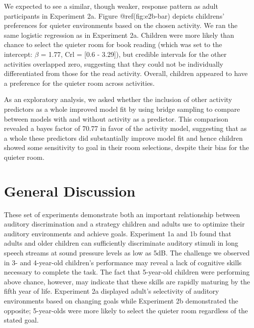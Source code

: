 \documentclass[10pt, letterpaper]{article}
\begin{document}
We expected to see a similar, though weaker, response pattern as adult
participants in Experiment 2a. Figure @ref(fig:e2b-bar) depicts
childrens' preferences for quieter environments based on the chosen
activity. We ran the same logistic regression as in Experiment 2a.
Children were more likely than chance to select the quieter room for
book reading (which was set to the intercept: \(\beta\) = 1.77, Crl =
{[}0.6 - 3.29{]}), but credible intervals for the other activities
overlapped zero, suggesting that they could not be individually
differentiated from those for the read activity. Overall, children
appeared to have a preference for the quieter room across activities.

As an exploratory analysis, we asked whether the inclusion of other
activity predictors as a whole improved model fit by using bridge
sampling to compare between models with and without activity as a
predictor. This comparison revealed a bayes factor of 70.77 in favor of
the activity model, suggesting that as a whole these predictors did
substantially improve model fit and hence children showed some
sensitivity to goal in their room selections, despite their bias for the
quieter room.

\hypertarget{general-discussion}{%
\section{General Discussion}\label{general-discussion}}

These set of experiments demonstrate both an important relationship
between auditory discrimination and a strategy children and adults use
to optimize their auditory environments and achieve goals. Experiment 1a
and 1b found that adults and older children can sufficiently
discriminate auditory stimuli in long speech streams at sound pressure
levels as low as 5dB. The challenge we observed in 3- and 4-year-old
children's performance may reveal a lack of cognitive skills necessary
to complete the task. The fact that 5-year-old children were performing
above chance, however, may indicate that these skills are rapidly
maturing by the fifth year of life. Experiment 2a displayed adult's
selectivity of auditory environments based on changing goals while
Experiment 2b demonstrated the opposite; 5-year-olds were more likely to
select the quieter room regardless of the stated goal.
\end{document}
